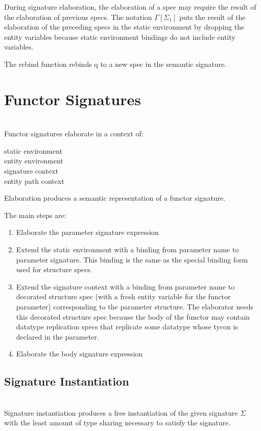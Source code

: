 During signature elaboration, the elaboration of a spec may require the result of the elaboration of previous specs. The notation $\Gamma[\Sigma_1]$ puts the result of the elaboration of the preceding specs in the static environment by dropping the entity variables because static environment bindings do not include entity variables. 

The rebind function rebinds q to a new spec in the semantic signature. 
\section{Functor Signatures}
\\
Functor signatures elaborate in a context of:
\begin{description}
\item[static environment]
\item[entity environment]
\item[signature context] 
\item[entity path context]
\end{description}
Elaboration produces a semantic representation of a functor signature.

The main steps are:
\begin{enumerate}
\item Elaborate the parameter signature expression
\item Extend the static environment with a binding from parameter name to parameter signature. This binding is the same as the special binding form used for structure specs. 
\item Extend the signature context with a binding from parameter name to decorated structure spec (with a fresh entity variable for the functor parameter) corresponding to the parameter structure. The elaborator needs this decorated structure spec because the body of the functor may contain datatype replication specs that replicate some datatype whose tycon is declared in the parameter. 
\item Elaborate the body signature expression
\end{enumerate}

\subsection{Signature Instantiation}
\\
Signature instantiation produces a free instantiation of the given signature $\Sigma$ with the least amount of type sharing necessary to satisfy the signature. 


